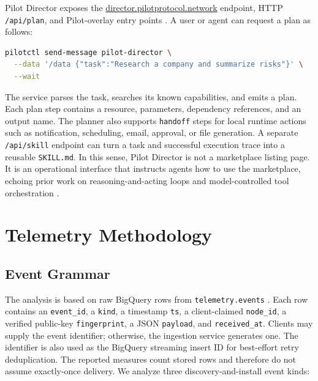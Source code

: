 \documentclass[10pt,twocolumn]{article}
\newcommand{\director}{Pilot Director}
\begin{document}
\director{} exposes the \href{https://director.pilotprotocol.network/}{director.pilotprotocol.network} endpoint, HTTP \texttt{/api/plan}, and Pilot-overlay entry points \cite{pilotDirector}. A user or agent can request a plan as follows:

\begin{lstlisting}[language=bash]
pilotctl send-message pilot-director \
  --data '/data {"task":"Research a company and summarize risks"}' \
  --wait
\end{lstlisting}

The service parses the task, searches its known capabilities, and emits a plan. Each plan step contains a resource, parameters, dependency references, and an output name. The planner also supports \texttt{handoff} steps for local runtime actions such as notification, scheduling, email, approval, or file generation. A separate \texttt{/api/skill} endpoint can turn a task and successful execution trace into a reusable \texttt{SKILL.md}. In this sense, \director{} is not a marketplace listing page. It is an operational interface that instructs agents how to use the marketplace, echoing prior work on reasoning-and-acting loops and model-controlled tool orchestration \cite{yao2023react,shen2023hugginggpt,zhou2023webarena}.

\section{Telemetry Methodology}
\label{sec:methodology}

\subsection{Event Grammar}

The analysis is based on raw BigQuery rows from \texttt{telemetry.events} \cite{pilotTelemetryBQ}. Each row contains an \texttt{event\_id}, a \texttt{kind}, a timestamp \texttt{ts}, a client-claimed \texttt{node\_id}, a verified public-key \texttt{fingerprint}, a JSON \texttt{payload}, and \texttt{received\_at}. Clients may supply the event identifier; otherwise, the ingestion service generates one. The identifier is also used as the BigQuery streaming insert ID for best-effort retry deduplication. The reported measures count stored rows and therefore do not assume exactly-once delivery. We analyze three discovery-and-install event kinds:
\end{document}
